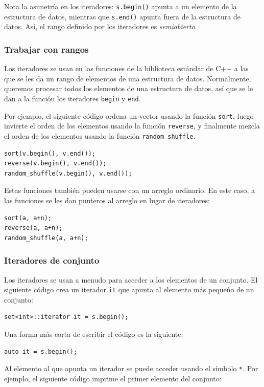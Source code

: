 Nota la asimetría en los iteradores:
\texttt{s.begin()} apunta a un elemento de la estructura de datos,
mientras que \texttt{s.end()} apunta fuera de la estructura de datos.
Así, el rango definido por los iteradores es \emph{semiabierto}.

\subsubsection{Trabajar con rangos}

Los iteradores se usan en las funciones de la biblioteca estándar de C++
a las que se les da un rango de elementos de una estructura de datos.
Normalmente, queremos procesar todos los elementos de una
estructura de datos, así que se le dan a la función los iteradores
\texttt{begin} y \texttt{end}.

Por ejemplo, el siguiente código ordena un vector
usando la función \texttt{sort},
luego invierte el orden de los elementos usando la función
\texttt{reverse}, y finalmente mezcla el orden de
los elementos usando la función \texttt{random\_shuffle}.


\begin{lstlisting}
sort(v.begin(), v.end());
reverse(v.begin(), v.end());
random_shuffle(v.begin(), v.end());
\end{lstlisting}

Estas funciones también pueden usarse con un arreglo ordinario.
En este caso, a las funciones se les dan punteros al arreglo
en lugar de iteradores:

\newpage
\begin{lstlisting}
sort(a, a+n);
reverse(a, a+n);
random_shuffle(a, a+n);
\end{lstlisting}

\subsubsection{Iteradores de conjunto}

Los iteradores se usan a menudo para acceder a
los elementos de un conjunto.
El siguiente código crea un iterador
\texttt{it} que apunta al elemento más pequeño de un conjunto:
\begin{lstlisting}
set<int>::iterator it = s.begin();
\end{lstlisting}
Una forma más corta de escribir el código es la siguiente:
\begin{lstlisting}
auto it = s.begin();
\end{lstlisting}
Al elemento al que apunta un iterador
se puede acceder usando el símbolo \texttt{*}.
Por ejemplo, el siguiente código imprime
el primer elemento del conjunto:

